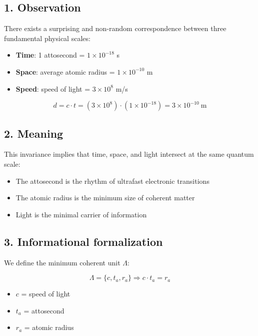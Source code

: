 \documentclass[12pt]{article}
\begin{document}
\subsection*{1. Observation}
There exists a surprising and non-random correspondence between three fundamental physical scales:
\begin{itemize}
    \item \textbf{Time}: 1 attosecond = $1 \times 10^{-18}$ s
    \item \textbf{Space}: average atomic radius = $1 \times 10^{-10}$ m
    \item \textbf{Speed}: speed of light = $3 \times 10^8$ m/s
\end{itemize}

\begin{equation}
    d = c \cdot t = (3 \times 10^8) \cdot (1 \times 10^{-18}) = 3 \times 10^{-10}~\text{m}
\end{equation}

\subsection*{2. Meaning}
This invariance implies that time, space, and light intersect at the same quantum scale:
\begin{itemize}
    \item The attosecond is the rhythm of ultrafast electronic transitions
    \item The atomic radius is the minimum size of coherent matter
    \item Light is the minimal carrier of information
\end{itemize}

\subsection*{3. Informational formalization}
We define the minimum coherent unit $\Lambda$:

\begin{equation}
    \Lambda = \{c, t_a, r_a\} \Rightarrow c \cdot t_a = r_a
\end{equation}

\begin{itemize}
    \item $c$ = speed of light
    \item $t_a$ = attosecond
    \item $r_a$ = atomic radius
\end{itemize}
\end{document}
